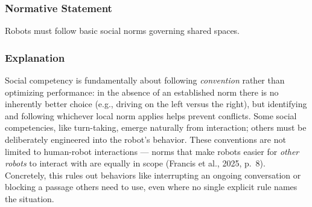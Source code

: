 \documentclass[utf8]{frontiers_suppmat} %
\newenvironment{Shaded}{\begin{shaded}}{\end{shaded}}
\begin{document}
\subsubsection{Normative Statement}\label{normative-statement-5}

Robots must follow basic social norms governing shared spaces.

\subsubsection{Explanation}\label{explanation-5}

Social competency is fundamentally about following \emph{convention}
rather than optimizing performance: in the absence of an established
norm there is no inherently better choice (e.g., driving on the left
versus the right), but identifying and following whichever local norm
applies helps prevent conflicts. Some social competencies, like
turn-taking, emerge naturally from interaction; others must be
deliberately engineered into the robot's behavior. These conventions are
not limited to human-robot interactions --- norms that make robots
easier for \emph{other robots} to interact with are equally in scope
(Francis et al., 2025, p.~8). Concretely, this rules out behaviors like
interrupting an ongoing conversation or blocking a passage others need
to use, even where no single explicit rule names the situation.

\begin{Shaded}
\begin{Highlighting}[]
\KeywordTok{:}
\KeywordTok{:}
\KeywordTok{:}
\KeywordTok{: }\CharTok{\textgreater{}}
\KeywordTok{:}
\AttributeTok{  }\KeywordTok{:}
\AttributeTok{    }\KeywordTok{{-}}\AttributeTok{ }
\AttributeTok{    }\KeywordTok{{-}}\AttributeTok{ }
\AttributeTok{  }\KeywordTok{:}
\AttributeTok{    }\KeywordTok{{-}}\AttributeTok{ }
\AttributeTok{    }\KeywordTok{{-}}\AttributeTok{ }
\end{Highlighting}
\end{Shaded}
\end{document}
